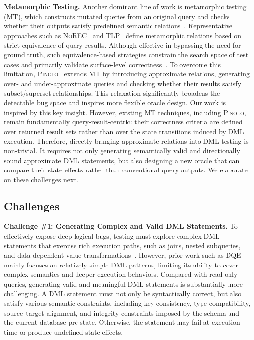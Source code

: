 \textbf{Metamorphic Testing.}
Another dominant line of work is metamorphic testing (MT), which constructs mutated queries from an original query and checks whether their outputs satisfy predefined semantic relations~\cite{rigger2020detecting,rigger2020finding,rigger2020testing,tang2023detecting,jiang2024detecting,song2024detecting,deng2025detecting}. 
Representative approaches such as \textsc{NoREC}~\cite{rigger2020detecting} and \textsc{TLP}~\cite{rigger2020finding} define metamorphic relations based on strict equivalence of query results. 
Although effective in bypassing the need for ground truth, such equivalence-based strategies constrain the search space of test cases and primarily validate surface-level correctness~\cite{hao2023pinolo}.
To overcome this limitation, \textsc{Pinolo}~\cite{hao2023pinolo} extends MT by introducing approximate relations, generating over- and under-approximate queries and checking whether their results satisfy subset/superset relationships. 
This relaxation significantly broadens the detectable bug space and inspires more flexible oracle design. 
Our work is inspired by this key insight. 
However, existing MT techniques, including \textsc{Pinolo}, remain fundamentally query-result-centric: their correctness criteria are defined over returned result sets rather than over the state transitions induced by DML execution. 
Therefore, directly bringing approximate relations into DML testing is non-trivial. 
It requires not only generating semantically valid and directionally sound approximate DML statements, but also designing a new oracle that can compare their state effects rather than conventional query outputs. 
We elaborate on these challenges next.

\vspace{-3mm}
\subsection{Challenges}
\textbf{Challenge \#1: Generating Complex and Valid DML Statements.}
To effectively expose deep logical bugs, testing must explore complex DML statements that exercise rich execution paths, such as joins, nested subqueries, and data-dependent value transformations~\cite{hao2023pinolo}.
However, prior work such as \textsc{DQE}~\cite{song2023testing} mainly focuses on relatively simple DML patterns, limiting its ability to cover complex semantics and deeper execution behaviors.
Compared with read-only queries, generating valid and meaningful DML statements is substantially more challenging.
A DML statement must not only be syntactically correct, but also satisfy various semantic constraints, including key consistency, type compatibility, source--target alignment, and integrity constraints imposed by the schema and the current database pre-state.
Otherwise, the statement may fail at execution time or produce undefined state effects.

